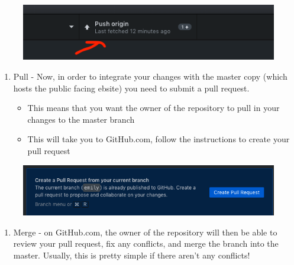 \documentclass[]{book}
\providecommand{\tightlist}{%
  \setlength{\itemsep}{0pt}\setlength{\parskip}{0pt}}
\begin{document}
\begin{figure}
\centering
\includegraphics{images/research_protocols/github/26.png}
\caption{}
\end{figure}

\begin{enumerate}
\def\labelenumi{\arabic{enumi}.}
\setcounter{enumi}{5}
\tightlist
\item
  Pull - Now, in order to integrate your changes with the master copy (which hosts the public facing ebsite) you need to submit a pull request.

  \begin{itemize}
  \tightlist
  \item
    This means that you want the owner of the repository to pull in your changes to the master branch
  \item
    This will take you to GitHub.com, follow the instructions to create your pull request
  \end{itemize}
\end{enumerate}

\begin{figure}
\centering
\includegraphics{images/research_protocols/github/27.png}
\caption{}
\end{figure}

\begin{enumerate}
\def\labelenumi{\arabic{enumi}.}
\setcounter{enumi}{6}
\tightlist
\item
  Merge - on GitHub.com, the owner of the repository will then be able to review your pull request, fix any conflicts, and merge the branch into the master. Usually, this is pretty simple if there aren't any conflicts!
\end{enumerate}
\end{document}
